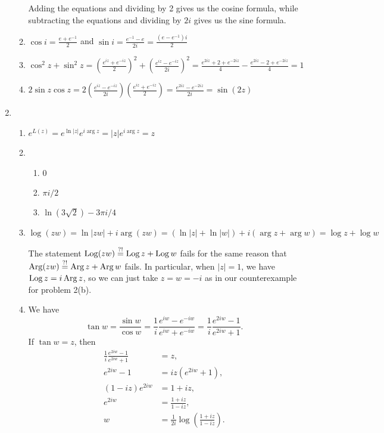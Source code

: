 \begin{enumerate}
\begin{enumerate}
Adding the equations and dividing by 2 gives us the cosine formula, while subtracting the equations and dividing by $2i$ gives us the sine formula.
\item $\cos i = \frac{e + e^{-1}}{2}$ and $\sin i = \frac{e^{-1} - e}{2i} = \frac{(e - e^{-1})i}{2}$
\item $\cos^2 z + \sin^2 z = \left(\frac{e^{iz} + e^{-iz}}{2}\right)^2 + \left(\frac{e^{iz} - e^{-iz}}{2i}\right)^2 = \frac{e^{2iz} + 2 + e^{-2iz}}{4} - \frac{e^{2iz} - 2 + e^{-2iz}}{4} = 1$
\item $2\sin z\cos z = 2\left(\frac{e^{iz} - e^{-iz}}{2i}\right)\left(\frac{e^{iz} + e^{-iz}}{2}\right) = \frac{e^{2iz} - e^{-2iz}}{2i} = \sin(2z)$
\end{enumerate}
\item \begin{enumerate}
\item $e^{L(z)} = e^{\ln\lvert z\rvert}e^{i\arg z} = \lvert z\rvert e^{i\arg z} = z$
\item \begin{enumerate}
\item 0
\item $\pi i/2$
\item $\ln(3\sqrt{2}) - 3\pi i/4$
\end{enumerate}
\item $\log(zw) = \ln\lvert zw\rvert + i\arg(zw) = (\ln\lvert z\rvert + \ln\lvert w\rvert) + i(\arg z + \arg w) = \log z + \log w$\par
The statement $\operatorname{Log}(zw)\stackrel{?!}{=} \operatorname{Log} z + \operatorname{Log} w$ fails for the same reason that $\operatorname{Arg}(zw)\stackrel{?!}{=}\operatorname{Arg} z + \operatorname{Arg} w$ fails. In particular, when $\lvert z\rvert = 1$, we have $\operatorname{Log} z = i\operatorname{Arg} z$, so we can just take $z = w = -i$ as in our counterexample for problem 2(b).
\item We have
\begin{equation*}
\tan w = \frac{\sin w}{\cos w} = \frac{1}{i}\frac{e^{iw} - e^{-iw}}{e^{iw} + e^{-iw}} = \frac{1}{i}\frac{e^{2iw} - 1}{e^{2iw} + 1}.
\end{equation*}
If $\tan w = z$, then
\begin{align*}
\frac{1}{i}\frac{e^{2iw} - 1}{e^{2iw} + 1} &= z, \\
e^{2iw} - 1 &= iz(e^{2iw} + 1), \\
(1 - iz)e^{2iw} &= 1 + iz, \\
e^{2iw} &= \frac{1 + iz}{1 - iz}, \\
w &= \frac{1}{2i}\log\left(\frac{1 + iz}{1 - iz}\right).
\end{align*}

\end{enumerate}
\end{enumerate}
